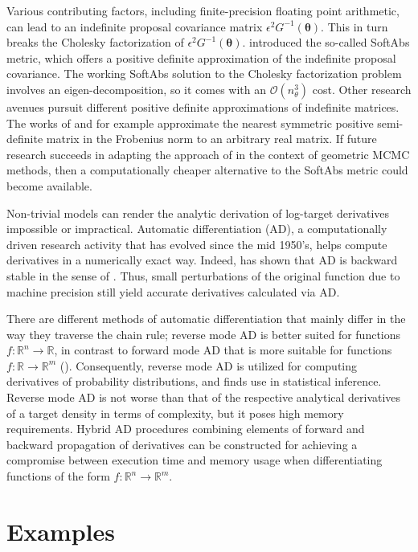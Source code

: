 \documentclass[twoside,11pt]{article}
\begin{document}
Various contributing factors, including finite-precision floating point arithmetic, can lead to an indefinite proposal
covariance matrix $\epsilon^2 G^{-1}(\boldsymbol{\theta})$. This in turn breaks the Cholesky factorization of 
$\epsilon^2 G^{-1}(\boldsymbol{\theta})$. \cite{bet__age} introduced the so-called SoftAbs metric, which offers a 
positive definite approximation of the indefinite proposal covariance. The working SoftAbs solution to the Cholesky 
factorization problem involves an eigen-decomposition, so it comes with an $\mathcal{O}(n_{\theta}^3)$ cost.
Other research avenues pursuit different positive definite approximations of indefinite matrices. The works of 
\cite{hig__com01} and \cite{hig__com02} for example approximate the nearest symmetric positive semi-definite matrix in the 
Frobenius norm to an arbitrary real matrix. If future research succeeds in adapting the approach of \cite{hig__com01} in the 
context of geometric MCMC methods, then a computationally cheaper alternative to the SoftAbs metric could become available.

Non-trivial models can render the analytic derivation of log-target derivatives impossible or impractical. Automatic
differentiation (AD), a computationally driven research activity that has evolved since the mid 1950's, helps compute 
derivatives in a numerically exact way. Indeed, \cite{gri__ona} has shown that AD is backward stable in the sense of 
\cite{wil__mod}. Thus, small perturbations of the original function due to machine precision still yield accurate 
derivatives calculated via AD.

There are different methods of automatic differentiation that mainly differ in the way they traverse the chain rule; reverse 
mode AD is better suited for functions $f:\mathbb{R}^n\rightarrow\mathbb{R}$, in contrast to forward mode AD that is more 
suitable for functions $f:\mathbb{R}\rightarrow\mathbb{R}^m$ (\cite{gri_wal__eva}). Consequently, reverse mode AD is 
utilized for computing derivatives of probability distributions, and finds use in statistical inference. Reverse mode AD is 
not worse than that of the respective analytical derivatives of a target density in terms of complexity, but it poses high
memory requirements. Hybrid AD procedures combining elements of forward and backward propagation of derivatives can be 
constructed for achieving a compromise between execution time and memory usage when differentiating functions of the form
$f:\mathbb{R}^n\rightarrow\mathbb{R}^m$.

\section{Examples}
\label{Examples}
\end{document}
